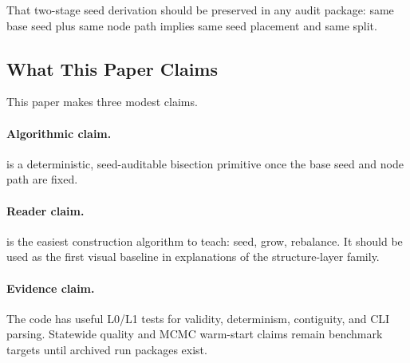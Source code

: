 That two-stage seed derivation should be preserved in any audit package:
same base seed plus same node path implies same seed placement and same split.

\subsection{What This Paper Claims}

This paper makes three modest claims.

\paragraph{Algorithmic claim.}
\bfsg{} is a deterministic, seed-auditable bisection primitive once the base
seed and node path are fixed.

\paragraph{Reader claim.}
\bfsg{} is the easiest construction algorithm to teach: seed, grow, rebalance.
It should be used as the first visual baseline in explanations of the
structure-layer family.

\paragraph{Evidence claim.}
The code has useful L0/L1 tests for validity, determinism, contiguity, and CLI
parsing. Statewide quality and MCMC warm-start claims remain benchmark targets
until archived run packages exist.

